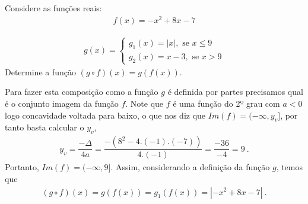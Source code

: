\begin{exem}
Considere as funções reais:
\begin{eqnarray}
f(x)= -x^2 + 8x -7
\end{eqnarray}

\begin{eqnarray}
g(x)= \begin{cases}
       g_1(x)= |x|, \text{ se } x \leqslant 9 \\
       g_2(x)= x-3, \text{ se } x > 9
	  \end{cases}
\end{eqnarray}
Determine a função $(g \circ f)(x)= g(f(x))$.
\begin{resol}
Para fazer esta composição como a função $g$ é definida por partes precisamos qual é o conjunto imagem da função $f$. Note que $f$ é uma função do 2º grau com $a< 0$ logo concavidade voltada para baixo, o que nos diz que $Im(f)= (-\infty, y_v]$, por tanto basta calcular o $y_v$,
\begin{eqnarray}
y_v= \dfrac{- \Delta}{4a}= \dfrac{-(8^2-4.(-1).(-7))}{4.(-1)}= \dfrac{-36}{-4}= 9 \ .
\end{eqnarray}
Portanto, $Im(f)= (-\infty, 9]$. Assim, considerando a definição da função $g$, temos que
\begin{eqnarray}
(g \circ f)(x)= g(f(x))= g_1(f(x))= |-x^2 + 8x -7| \ .
\end{eqnarray}
\end{resol}
\end{exem}

